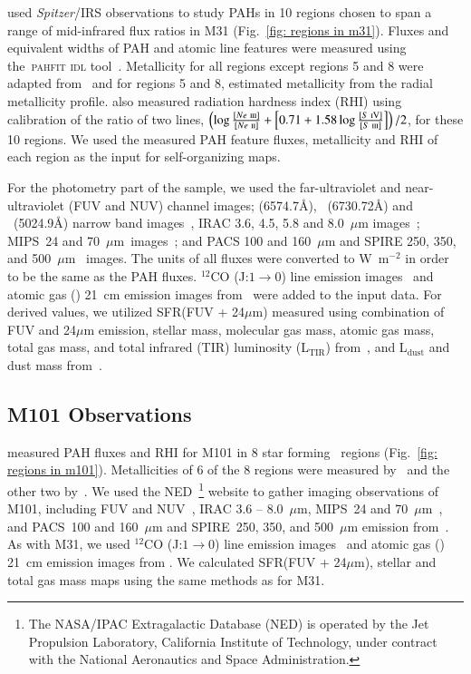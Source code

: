      \cite{Dim15} used {\it Spitzer}/IRS observations to study PAHs in 10 regions chosen to span a range of mid-infrared flux ratios in M31 (Fig.~\ref{fig: regions in m31}). 
     Fluxes and equivalent widths of PAH and atomic line features were measured using the~\textsc{pahfit idl} tool~\citep{Smith07b}.
     Metallicity for all regions except regions 5 and 8 were adapted from~\citep{Sanders12} and for regions 5 and 8, \cite{Dim15} estimated metallicity from the radial metallicity profile.
     \cite{Dim15} also measured radiation hardness index (RHI) using calibration of the ratio of two lines, $\left (\log \frac{[Ne~\textsc{iii}]}{[Ne~\textsc{ii}]} + \left [ 0.71 + 1.58\log\frac{[S~\textsc{iV}]}{[S~\textsc{iii}]} \right ] \right )/2$, for these 10 regions.
     We used the measured PAH feature fluxes, metallicity and RHI of each region as the input for self-organizing maps.
     
    For the photometry part of the sample, we used the \GALEX \citep{Martin05} far-ultraviolet and near-ultraviolet (FUV and NUV) channel images; \halpha (6574.7\AA), \sii~(6730.72\AA) and \oiii~(5024.9\AA) narrow band images~\citep{Massey07}, IRAC 3.6, 4.5, 5.8 and 8.0~$\mu$m images~\citep{Barmby06}; MIPS~24 and 70~$\mu$m~images~\citep{Gordon06}; and PACS 100 and 160~$\mu$m and SPIRE 250, 350, and 500~$\mu$m~\citep{Fritz12} images.
     The units of all fluxes were converted to W~m$^{-2}$ in order to be the same as the PAH fluxes.
     $^{12}$CO (J:$1\rightarrow0$) line emission images~\citep{Nieten06} and atomic gas (\hi) 21~cm emission images from~\cite{Chemin09} were added to the input data. 
     For derived values, we utilized SFR(FUV + 24$\mu$m) measured using combination of FUV and 24$\mu$m emission, stellar mass, molecular gas mass, atomic gas mass, total gas mass, and total infrared (TIR) luminosity (L$_\mathrm{TIR}$) from~\cite{Rahmani16}, and L$_\mathrm{dust}$ and dust mass from~\cite{Draine14}.
     
    \subsection{M101 Observations}
    \label{Sec: data_M101_SOMN} 
    
     \cite{Gordon08} measured PAH fluxes and RHI for M101 in 8 star forming \hii~regions (Fig.~\ref{fig: regions in m101}).
     Metallicities of 6 of the 8 regions were measured by~\cite{Kennicutt03} and the other two by~\cite{Gordon08}.
     We used the NED~\footnote{The NASA/IPAC Extragalactic Database (NED) is operated by the Jet Propulsion Laboratory, California Institute of Technology, under contract with the National Aeronautics and Space Administration.} website to gather imaging observations of M101, including 
      \GALEX FUV and NUV~\citep{depaz07}, IRAC 3.6 -- 8.0~$\mu$m, MIPS~24 and 70~$\mu$m~\citep{Dale09}, and PACS~100 and 160~$\mu$m and SPIRE~250, 350, and 500~$\mu$m emission from~\cite{Kennicutt11}.
     As with M31, we used $^{12}$CO (J:$1\rightarrow0$) line emission images~\citep{Helfer03} and atomic gas (\hi) 21~cm emission images from \cite{Walter08}.
     We calculated SFR(FUV + 24$\mu$m), stellar and total gas mass maps using the same methods as for M31.
     
